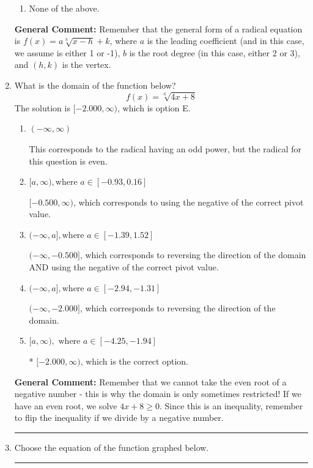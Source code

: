 \documentclass{extbook}[14pt]
\newcommand{\litem}[1]{\item #1

\rule{\textwidth}{0.4pt}}
\begin{document}
\begin{enumerate}
{\begin{enumerate}[label=\Alph*.]
\item None of the above.\end{enumerate}
\textbf{General Comment:} Remember that the general form of a radical equation is $ f(x) = a \sqrt[b]{x - h} + k $, where $a$ is the leading coefficient (and in this case, we assume is either 1 or -1), $b$ is the root degree (in this case, either 2 or 3), and $(h, k)$ is the vertex.
}
\litem{
What is the domain of the function below?
\[ f(x) = \sqrt[6]{4 x + 8} \]The solution is \( [-2.000, \infty) \), which is option E.\begin{enumerate}[label=\Alph*.]
\item \( (-\infty, \infty) \)

This corresponds to the radical having an odd power, but the radical for this question is even.
\item \( [a, \infty), \text{where } a \in [-0.93, 0.16] \)

$[-0.500, \infty)$, which corresponds to using the negative of the correct pivot value.
\item \( (-\infty, a], \text{where } a \in [-1.39, 1.52] \)

$(-\infty, -0.500]$, which corresponds to reversing the direction of the domain AND using the negative of the correct pivot value.
\item \( (-\infty, a], \text{where } a \in [-2.94, -1.31] \)

 $(-\infty, -2.000]$, which corresponds to reversing the direction of the domain.
\item \( [a, \infty), \text{ where } a \in [-4.25, -1.94] \)

* $[-2.000, \infty)$, which is the correct option.
\end{enumerate}

\textbf{General Comment:} Remember that we cannot take the even root of a negative number - this is why the domain is only sometimes restricted! If we have an even root, we solve $4 x + 8 \geq 0$. Since this is an inequality, remember to flip the inequality if we divide by a negative number.
}
\litem{
Choose the equation of the function graphed below.

}
\end{enumerate}
\end{document}
